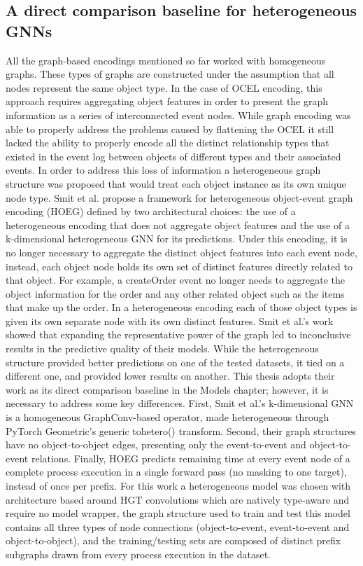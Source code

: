     \subsection{A direct comparison baseline for heterogeneous GNNs}
        All the graph-based encodings mentioned so far worked with homogeneous graphs. These types of graphs are constructed under the assumption that all nodes represent the same object type. In the case of OCEL encoding, this approach requires aggregating object features in order to present the graph information as a series of interconnected event nodes. While graph encoding was able to properly address the problems caused by flattening the OCEL it still lacked the ability to properly encode all the distinct relationship types that existed in the event log between objects of different types and their associated events.
        In order to address this loss of information a heterogeneous graph structure was proposed that would treat each object instance as its own unique node type. Smit et al. \cite{smit2024} propose a framework for heterogeneous object-event graph encoding (HOEG) defined by two architectural choices: the use of a heterogeneous encoding that does not aggregate object features and the use of a k-dimensional heterogeneous GNN for its predictions.
        Under this encoding, it is no longer necessary to aggregate the distinct object features into each event node, instead, each object node holds its own set of distinct features directly related to that object. For example, a createOrder event no longer needs to aggregate the object information for the order and any other related object such as the items that make up the order. In a heterogeneous encoding each of those object types is given its own separate node with its own distinct features.
        Smit et al.'s work showed that expanding the representative power of the graph led to inconclusive results in the predictive quality of their models. While the heterogeneous structure provided better predictions on one of the tested datasets, it tied on a different one, and provided lower results on another.
        This thesis adopts their work as its direct comparison baseline in the Models chapter; however, it is necessary to address some key differences. First, Smit et al.'s k-dimensional GNN is a homogeneous GraphConv-based operator, made heterogeneous through PyTorch Geometric's generic to\textunderscore hetero() transform. Second, their graph structures have no object-to-object edges, presenting only the event-to-event and object-to-event relations. Finally, HOEG predicts remaining time at every event node of a complete process execution in a single forward pass (no masking to one target), instead of once per prefix. For this work a heterogeneous model was chosen with architecture based around HGT convolutions which are natively type-aware and require no model wrapper, the graph structure used to train and test this model contains all three types of node connections (object-to-event, event-to-event and object-to-object), and the training/testing sets are composed of distinct prefix subgraphs drawn from every process execution in the dataset.

